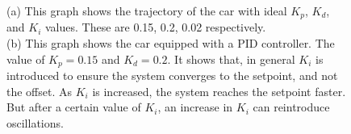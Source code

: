 \documentclass[10pt]{article}
\begin{document}
\begin{figure}[H]
\centering
{}
\qquad
{}
\caption
{(a) This graph shows the trajectory of the car with ideal $K_p$, $K_d$, and $K_i$ values. These are 0.15, 0.2, 0.02 respectively.\\
(b) This graph shows the car equipped with a PID controller. The value of $K_p = 0.15$ and $K_d = 0.2$. It shows that, in general $K_i$ is introduced to ensure the system converges to the setpoint, and not the offset. As $K_i$ is increased, the system reaches the setpoint faster. But after a certain value of $K_i$, an increase in $K_i$ can reintroduce oscillations.}
\end{figure}
\end{document}

